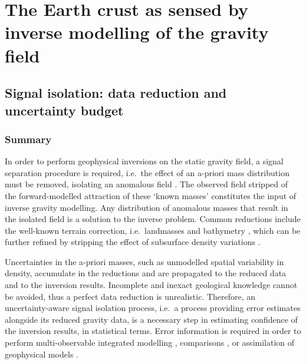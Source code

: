 



\setcounter{chapter}{2}
\chapter{The Earth crust as sensed by inverse modelling of the gravity field}

\setcounter{section}{1}
\section{Signal isolation: data reduction and uncertainty budget}

\subsection*{Summary}
In order to perform geophysical inversions on the static gravity field, a signal separation procedure is required, i.e.~the effect of an a-priori mass distribution must be removed, isolating an anomalous field \parencites[e.g.][]{Tenzer2012}{Sjoberg2013}[][and references therein]{Tenzer2009}.
The observed field stripped of the forward-modelled attraction of these `known masses' constitutes the input of inverse gravity modelling.
Any distribution of anomalous masses that result in the isolated field is a solution to the inverse problem.
Common reductions include the well-known terrain correction, i.e.~landmasses and bathymetry \parencites{Hinze2003}{Hinze2005}, which can be further refined by stripping the effect of subsurface density variations \parencite{Vajda2008}.

Uncertainties in the a-priori masses, such as unmodelled spatial variability in density, accumulate in the reductions and are propagated to the reduced data and to the inversion results.
Incomplete and inexact geological knowledge cannot be avoided, thus a perfect data reduction is unrealistic.
Therefore, an uncertainty-aware signal isolation process, i.e.~a process providing error estimates alongside its reduced gravity data, is a necessary step in estimating confidence of the inversion results, in statistical terms.
Error information is required in order to perform multi-observable integrated modelling \parencite[e.g.][]{Afonso2013}, comparisons \parencite[e.g.][]{Root2017}, or assimilation of geophysical models \parencites[e.g.~to assemble large scale maps from local studies, see][]{Tesauro2008}{Grad2009}{Molinari2011}.

